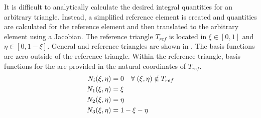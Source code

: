       It is difficult to analytically calculate the desired integral quantities
      for an arbitrary triangle. Instead, a simplified reference element is
      created and quantities are calculated for the reference element and then
      translated to the arbitrary element using a Jacobian.  The reference
      triangle $T_{ref}$ is located in $\xi \in [0,1]$ and $\eta \in [0,1-\xi]$.
      General and reference triangles are shown in .
      The basis functions are zero outside of the reference triangle. Within
      the reference triangle, basis functions for the are provided in the
      natural coordinates of $T_{ref}$.
      \begin{align}
        N_i(\xi,\eta) &= 0 \quad \forall \; (\xi,\eta) \notin T_{ref} \\
        N_1(\xi,\eta) &= \xi \\
        N_2(\xi,\eta) &= \eta \\
        N_3(\xi,\eta) &= 1-\xi-\eta
      \end{align}
      

